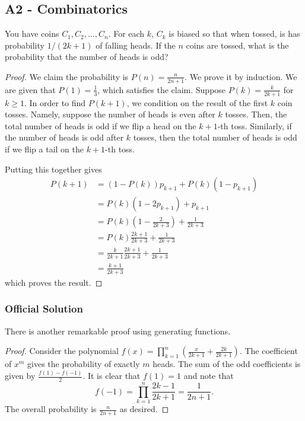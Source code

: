 \documentclass[11pt]{scrartcl}
\newcommand{\<}{\langle}
\renewcommand{\>}{\rangle}
\begin{document}
\subsection{A2 - Combinatorics}
You have coins $C_1, C_2, \dots, C_n$.  For each $k$, $C_k$ is biased so that when tossed, is has probability $1/(2k+1)$ of falling heads.  If the $n$ coins are tossed, what is the probability that the number of heads is odd?

\begin{proof}
We claim the probability is $P(n) = \boxed{\frac{n}{2n+1}}$.  We prove it by induction.  We are given that $P(1) = \frac{1}{3}$, which satisfies the claim.  Suppose $P(k) = \frac{k}{2k+1}$ for $k \ge 1$.  In order to find $P(k+1)$, we condition on the result of the first $k$ coin tosses.  Namely, suppose the number of heads is even after $k$ tosses.  Then, the total number of heads is odd if we flip a head on the $k+1$-th toss.  Similarly, if the number of heads is odd after $k$ tosses, then the total number of heads is odd if we flip a tail on the $k+1$-th toss.  

Putting this together gives 
\begin{align*}
P(k+1) &= (1 - P(k))p_{k+1} + P(k)(1 - p_{k+1}) \\
&= P(k)\left (1 - 2p_{k+1}\right ) + p_{k+1} \\
&= P(k) \left (1 - \frac{2}{2k+3}\right ) + \frac{1}{2k+3} \\
&= P(k) \frac{2k+1}{2k+3} + \frac{1}{2k+3} \\
&= \frac{k}{2k+1} \frac{2k+1}{2k+3} + \frac{1}{2k+3} \\
&=\frac{k+1}{2k+3}
\end{align*}
which proves the result.
\end{proof}

\subsubsection{Official Solution}
There is another remarkable proof using generating functions.
\begin{proof}
Consider the polynomial $f(x) = \prod_{k=1}^n \left (\frac{x}{2k+1} + \frac{2k}{2k+1} \right)$.  The coefficient of $x^m$ gives the probability of exactly $m$ heads.  The sum of the odd coefficients is given by $\frac{f(1) - f(-1)}{2}$.  It is clear that $f(1) = 1$ and note that 
$$f(-1) = \prod_{k=1}^n \frac{2k-1}{2k+1} = \frac{1}{2n+1}.$$
The overall probability is $\frac{n}{2n+1}$ as desired.
\end{proof}
\end{document}
